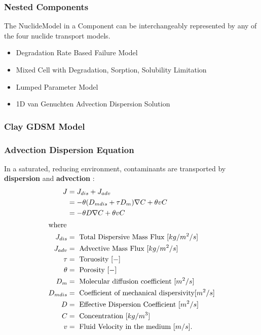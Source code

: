 
\begin{frame}
  \frametitle{Nested Components}
  The NuclideModel in a Component can be interchangeably represented by any of 
  the four nuclide transport models. 
    \begin{itemize}
      \item Degradation Rate Based Failure Model
      \item Mixed Cell with Degradation, Sorption, Solubility Limitation
      \item Lumped Parameter Model
      \item 1D van Genuchten Advection Dispersion Solution
    \end{itemize}
\end{frame}

\begin{frame}
\frametitle{Clay GDSM Model}

\end{frame}

\begin{frame}
  \frametitle{Advection Dispersion Equation}
  \footnotesize{
    In a saturated, reducing environment, contaminants are transported by 
    \textbf{dispersion} and \textbf{advection} 
    \cite{schwartz_fundamentals_2004, 
    wang_introduction_1982, van_genuchten_analytical_1982}: 
    \begin{align}
      J &= J_{dis} + J_{adv}\nonumber\\
      &= -\theta(D_{mdis} + \tau D_m)\nabla C + \theta vC\nonumber\\ 
      &= -\theta D\nabla C + \theta vC \nonumber\\ 
      \label{unidirflow}
      \intertext{where}
      J_{dis} &= \mbox{ Total Dispersive Mass Flux }[kg/m^2/s]\nonumber\\
      J_{adv} &= \mbox{ Advective Mass Flux }[kg/m^2/s]\nonumber\\
      \tau &= \mbox{ Toruosity }[-] \nonumber\\
      \theta &= \mbox{ Porosity }[-] \nonumber\\
      D_m &= \mbox{ Molecular diffusion coefficient }[m^2/s]\nonumber\\
      D_{mdis} &= \mbox{ Coefficient of mechanical dispersivity}[m^2/s]\nonumber\\
      D &= \mbox{ Effective Dispersion Coefficient }[m^2/s]\nonumber\\
      C &= \mbox{ Concentration }[kg/m^3]\nonumber\\
      v &= \mbox{ Fluid Velocity in the medium }[m/s].\nonumber
    \end{align}
    }

\end{frame}

